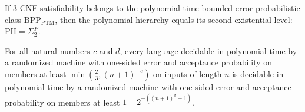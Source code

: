 \begin{theorem}
\label{Randomized.PH_eq_SigmaP_two_of_SAT3_mem_BPP_PTM}
\leanok
{}
If $3$-CNF satisfiability belongs to the polynomial-time bounded-error probabilistic
class $\mathrm{BPP}_{\mathrm{PTM}}$, then the polynomial hierarchy equals its second
existential level: $\mathrm{PH}=\Sigma_2^P$.
\end{theorem}

\begin{theorem}
\label{Randomized.RP_PTMWith_error_reduction}
\leanok
{}
For all natural numbers $c$ and $d$, every language decidable in polynomial time by a
randomized machine with one-sided error and acceptance probability on members at least
$\min\!\left(\frac{2}{3},(n+1)^{-c}\right)$ on inputs of length $n$ is decidable in
polynomial time by a randomized machine with one-sided error and acceptance probability
on members at least $1-2^{-((n+1)^d+1)}$.
\end{theorem}
